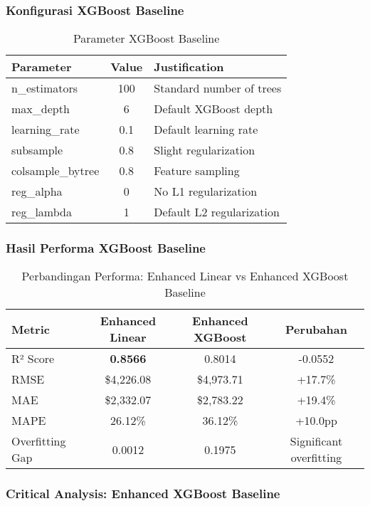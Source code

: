\subsubsection{Konfigurasi XGBoost Baseline}
\begin{table}[H]
\centering
\caption{Parameter XGBoost Baseline}
\label{tab:xgboost-baseline-params}
\begin{tabular}{|l|c|l|}
\hline
\textbf{Parameter} & \textbf{Value} & \textbf{Justification} \\
\hline
n\_estimators & 100 & Standard number of trees \\
max\_depth & 6 & Default XGBoost depth \\
learning\_rate & 0.1 & Default learning rate \\
subsample & 0.8 & Slight regularization \\
colsample\_bytree & 0.8 & Feature sampling \\
reg\_alpha & 0 & No L1 regularization \\
reg\_lambda & 1 & Default L2 regularization \\
\hline
\end{tabular}
\end{table}

\subsubsection{Hasil Performa XGBoost Baseline}
\begin{table}[H]
\centering
\caption{Perbandingan Performa: Enhanced Linear vs Enhanced XGBoost Baseline}
\label{tab:enhanced-baseline-comparison}
\begin{tabular}{|l|c|c|c|}
\hline
\textbf{Metric} & \textbf{Enhanced Linear} & \textbf{Enhanced XGBoost} & \textbf{Perubahan} \\
\hline
R² Score & \textbf{0.8566} & 0.8014 & -0.0552 \\
RMSE & \$4,226.08 & \$4,973.71 & +17.7\% \\
MAE & \$2,332.07 & \$2,783.22 & +19.4\% \\
MAPE & 26.12\% & 36.12\% & +10.0pp \\
Overfitting Gap & 0.0012 & 0.1975 & Significant overfitting \\
\hline
\end{tabular}
\end{table}

\subsubsection{Critical Analysis: Enhanced XGBoost Baseline}

